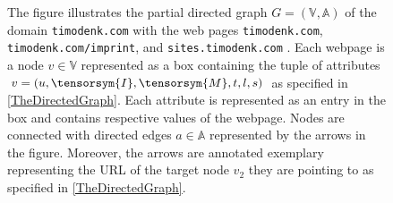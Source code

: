 \begin{figure}
{
}
\caption{The figure illustrates the partial directed graph $G = (\mathbb{V}, \mathbb{A})$ of the domain \texttt{timodenk.com} with the web pages \texttt{timodenk.com}, \texttt{timodenk.com/imprint},   and \texttt{sites.timodenk.com} . Each webpage is a node $v \in \mathbb{V}$ represented as a box containing the tuple of attributes $v = (u, \tensorsym{I}, \tensorsym{M},t, l, s)$ as specified in \ref{TheDirectedGraph}. Each attribute is represented as an entry in the box and contains respective values of the webpage. Nodes are connected with directed edges $a \in \mathbb{A}$ represented by the arrows in the figure. Moreover, the arrows are annotated exemplary representing the URL of the target node $v_2$ they are pointing to as specified in \ref{TheDirectedGraph}. }
\label{fig:PartialDirectedGraph_timodenk.com}
\end{figure}
